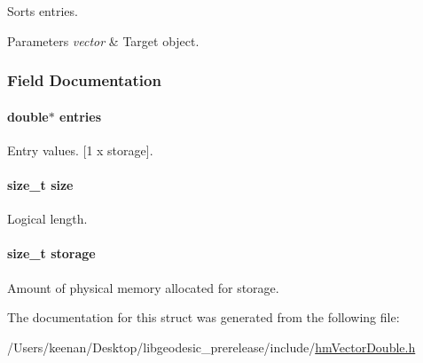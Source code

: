 Sorts entries. 


\begin{DoxyParams}{Parameters}
{\em vector} & Target object. \\
\hline
\end{DoxyParams}


\subsubsection{Field Documentation}
\hypertarget{structhm_vector_double_a6174721ab7cd68c9ad7a482500ce108d}{
\paragraph[{entries}]{\setlength{\rightskip}{0pt plus 5cm}double$\ast$ entries}}\label{structhm_vector_double_a6174721ab7cd68c9ad7a482500ce108d}


Entry values. \mbox{[}1 x storage\mbox{]}. 

\hypertarget{structhm_vector_double_a854352f53b148adc24983a58a1866d66}{
\paragraph[{size}]{\setlength{\rightskip}{0pt plus 5cm}size\-\_\-t size}}\label{structhm_vector_double_a854352f53b148adc24983a58a1866d66}


Logical length. 

\hypertarget{structhm_vector_double_ad69ae78713b41381c4d71371aae6e63e}{
\paragraph[{storage}]{\setlength{\rightskip}{0pt plus 5cm}size\-\_\-t storage}}\label{structhm_vector_double_ad69ae78713b41381c4d71371aae6e63e}


Amount of physical memory allocated for storage. 



The documentation for this struct was generated from the following file\-:\begin{DoxyCompactItemize}
\item 
/\-Users/keenan/\-Desktop/libgeodesic\-\_\-prerelease/include/\hyperlink{hm_vector_double_8h}{hm\-Vector\-Double.\-h}\end{DoxyCompactItemize}
